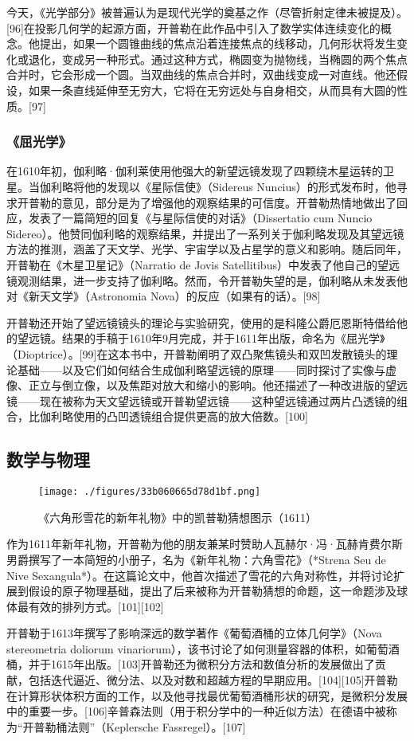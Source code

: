 今天，《光学部分》被普遍认为是现代光学的奠基之作（尽管折射定律未被提及）。[96]在投影几何学的起源方面，开普勒在此作品中引入了数学实体连续变化的概念。他提出，如果一个圆锥曲线的焦点沿着连接焦点的线移动，几何形状将发生变化或退化，变成另一种形式。通过这种方式，椭圆变为抛物线，当椭圆的两个焦点合并时，它会形成一个圆。当双曲线的焦点合并时，双曲线变成一对直线。他还假设，如果一条直线延伸至无穷大，它将在无穷远处与自身相交，从而具有大圆的性质。[97]
\subsubsection{《屈光学》}
在1610年初，伽利略·伽利莱使用他强大的新望远镜发现了四颗绕木星运转的卫星。当伽利略将他的发现以《星际信使》（Sidereus Nuncius）的形式发布时，他寻求开普勒的意见，部分是为了增强他的观察结果的可信度。开普勒热情地做出了回应，发表了一篇简短的回复《与星际信使的对话》（Dissertatio cum Nuncio Sidereo）。他赞同伽利略的观察结果，并提出了一系列关于伽利略发现及其望远镜方法的推测，涵盖了天文学、光学、宇宙学以及占星学的意义和影响。随后同年，开普勒在《木星卫星记》（Narratio de Jovis Satellitibus）中发表了他自己的望远镜观测结果，进一步支持了伽利略。然而，令开普勒失望的是，伽利略从未发表他对《新天文学》（Astronomia Nova）的反应（如果有的话）。[98]

开普勒还开始了望远镜镜头的理论与实验研究，使用的是科隆公爵厄恩斯特借给他的望远镜。结果的手稿于1610年9月完成，并于1611年出版，命名为《屈光学》（Dioptrice）。[99]在这本书中，开普勒阐明了双凸聚焦镜头和双凹发散镜头的理论基础——以及它们如何结合生成伽利略望远镜的原理——同时探讨了实像与虚像、正立与倒立像，以及焦距对放大和缩小的影响。他还描述了一种改进版的望远镜——现在被称为天文望远镜或开普勒望远镜——这种望远镜通过两片凸透镜的组合，比伽利略使用的凸凹透镜组合提供更高的放大倍数。[100]
\subsection{数学与物理}
\begin{figure}[ht]
\centering
\texttt{[image: ./figures/33b060665d78d1bf.png]}
\caption{《六角形雪花的新年礼物》中的凯普勒猜想图示（1611）} \label{fig_KPL1_17}
\end{figure}
作为1611年新年礼物，开普勒为他的朋友兼某时赞助人瓦赫尔·冯·瓦赫肯费尔斯男爵撰写了一本简短的小册子，名为《新年礼物：六角雪花》（*Strena Seu de Nive Sexangula*）。在这篇论文中，他首次描述了雪花的六角对称性，并将讨论扩展到假设的原子物理基础，提出了后来被称为开普勒猜想的命题，这一命题涉及球体最有效的排列方式。[101][102]

开普勒于1613年撰写了影响深远的数学著作《葡萄酒桶的立体几何学》（Nova stereometria doliorum vinariorum），该书讨论了如何测量容器的体积，如葡萄酒桶，并于1615年出版。[103]开普勒还为微积分方法和数值分析的发展做出了贡献，包括迭代逼近、微分法、以及对数和超越方程的早期应用。[104][105]开普勒在计算形状体积方面的工作，以及他寻找最优葡萄酒桶形状的研究，是微积分发展中的重要一步。[106]辛普森法则（用于积分学中的一种近似方法）在德语中被称为“开普勒桶法则”（Keplersche Fassregel）。[107]

